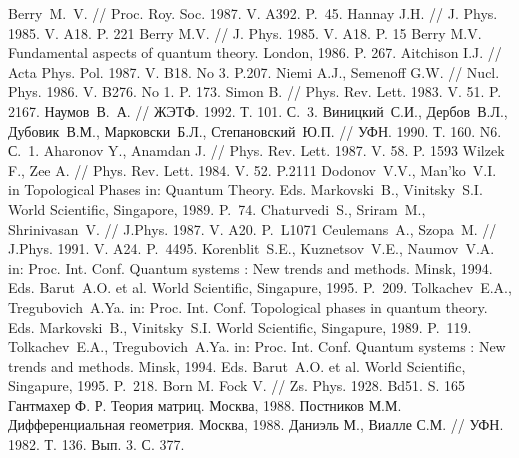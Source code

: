 \documentclass[a4paper,titlepage]{article}
\begin{document}
\newpage
\begin{thebibliography}{10}

 Berry~M.~V. // Proc. Roy. Soc. 1987. V. A392. P.~45.
 Hannay J.H. // J. Phys. 1985. V. A18. P. 221
 Berry M.V. // J. Phys. 1985. V. A18. P. 15
 Berry M.V. Fundamental aspects of quantum theory. London, 1986. P. 267.
 Aitchison I.J. // Acta Phys. Pol. 1987. V. B18. No 3. P.207.
 Niemi A.J., Semenoff G.W. // Nucl. Phys. 1986. V. B276. No 1. P. 173.
 Simon B. // Phys. Rev. Lett. 1983. V. 51. P. 2167.
 Наумов~В.~А. // ЖЭТФ. 1992. Т. 101. С.~3.
 Виницкий~С.И., Дербов~В.Л., Дубовик~В.М., Марковски~Б.Л., Степановский~Ю.П.
 // УФН. 1990. Т. 160. N6. С.~1.
 Aharonov Y., Anamdan J. // Phys. Rev. Lett. 1987. V. 58. P. 1593
  Wilzek F., Zee A. // Phys. Rev. Lett. 1984. V. 52. P.2111
 Dodonov~V.V., Man'ko~V.I. in Topological Phases in: Quantum Theory.
 Eds. Markovski~B., Vinitsky~S.I. World Scientific, Singapore, 1989. P.~74.
 Chaturvedi~S., Sriram~M., Shrinivasan~V. // J.Phys. 1987. V. A20. P.~L1071
 Ceulemans~A., Szopa~M. // J.Phys. 1991. V. A24. P.~4495.
 Korenblit~S.E., Kuznetsov~V.E., Naumov~V.A. in: Proc. Int. Conf.
 Quantum systems : New trends and methods. Minsk, 1994.
 Eds. Barut~A.O. et al. World Scientific, Singapure, 1995. P.~209.
  Tolkachev~E.A., Tregubovich~A.Ya. in: Proc. Int. Conf.
  Topological phases in quantum theory. Eds. Markovski~B., Vinitsky~S.I.
  World Scientific, Singapure, 1989. P.~119.
  Tolkachev~E.A., Tregubovich~A.Ya. in: Proc. Int. Conf.
 Quantum systems : New trends and methods. Minsk, 1994.
 Eds. Barut~A.O. et al. World Scientific, Singapure, 1995. P.~218.
 Born M. Fock V. // Zs. Phys. 1928. Bd51. S. 165
 Гантмахер Ф. Р. Теория матриц. Москва, 1988.
 Постников М.М. Дифференциальная геометрия. Москва, 1988.
 Даниэль М., Виалле С.М. // УФН. 1982. Т. 136. Вып. 3. С. 377.
\end{thebibliography}
\end{document}
